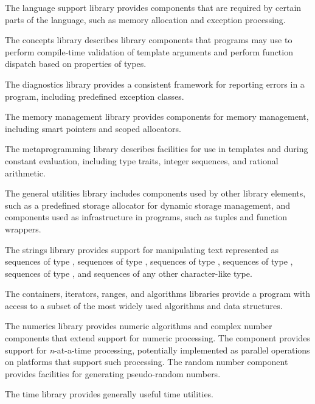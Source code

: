 \pnum
The language support library provides components that are
required by certain parts of the \Cpp{} language,
such as memory allocation and
exception processing.

\pnum
The concepts library describes library components that \Cpp{}
programs may use to perform compile-time validation of template arguments and
perform function dispatch based on properties of types.

\pnum
The diagnostics library provides a consistent framework for
reporting errors in a \Cpp{} program, including predefined exception classes.

\pnum
The memory management library provides components for
memory management, including smart pointers and scoped allocators.

\pnum
The metaprogramming library describes facilities
for use in templates and during constant evaluation,
including type traits, integer sequences, and rational arithmetic.

\pnum
The general utilities library includes components used
by other library elements, such as a predefined storage allocator for dynamic
storage management, and components used
as infrastructure
in \Cpp{} programs,
such as tuples and function wrappers.

\pnum
The strings library provides support for manipulating text represented
as sequences of type ,
sequences of type ,
sequences of type ,
sequences of type ,
sequences of type ,
and sequences of any other character-like type.

\pnum
The containers, iterators, ranges,
and algorithms libraries provide a \Cpp{} program with access
to a subset of the most widely used algorithms and data structures.

\pnum
The numerics library provides
numeric algorithms and complex number components that extend support for numeric processing.
The
component provides support for
\textit{n}-at-a-time
processing,
potentially implemented as parallel operations on platforms that support such processing.
The random number component provides facilities for generating pseudo-random numbers.

\pnum
The time library provides
generally useful time utilities.

